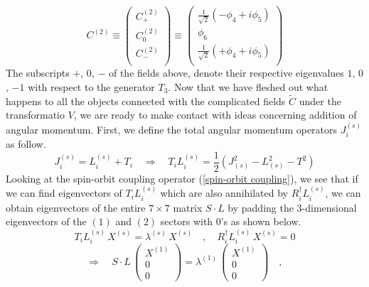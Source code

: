 %
%
\begin{equation}\label{T eiegen-fields 2}
C^{(2)}
\equiv
\left( \begin{array}{c}
C^{(2)}_{+} \\
C^{(2)}_{0} \\
C^{(2)}_{-} \\
\end{array} \right)
\equiv
\left( \begin{array}{c}
\frac{1}{\sqrt{2}} (-\phi_4 + i \phi_5) \\
\phi_6 \\
\frac{1}{\sqrt{2}} (+\phi_4 + i \phi_5) \\
\end{array} \right)
\end{equation}
%
%
The subscripts $+$, $0$, $-$ of the fields above, denote their respective eigenvalues $1$, $0$, $-1$ with respect to the generator $T_3$. Now that we have fleshed out what happens to all the objects connected with the complicated fields $\tilde{C}$ under the transformatio $V$, we are ready to make contact with ideas concerning addition of angular momentum. First, we define the total angular momentum operators $J_i^{(s)}$ as follow.
%
%
\begin{equation}\label{total angular momentum}
J_i^{(s)} = L_i^{(s)} + T_i
%
\quad \Rightarrow \quad
%
T_i L_i^{(s)} = \frac{1}{2} \left(
J^2_{(s)} - L^2_{(s)} - T^2
\right)
\end{equation}
%
%
Looking at the spin-orbit coupling operator (\ref{spin-orbit coupling}), we see that if we can find eigenvectors of $T_i L_i^{(s)}$ which are also annihilated by $R_i^\dagger L_i^{(s)}$, we can obtain eigenvectors of the entire $7 \times 7$ matrix $S \cdot L$ by padding the $3$-dimensional eigenvectors of the $(1)$ and $(2)$ sectors with $0$'s as shown below.
%
%
\begin{equation*}
T_i L_i^{(s)} \, X^{(s)} = \lambda^{(s)} \, X^{(s)}
%
\quad , \quad
%
R_i^\dagger L_i^{(s)} \, X^{(s)} = 0
\end{equation*}
%
%
\begin{equation*}
\Rightarrow \quad
%
S \cdot L \, \left( \begin{array}{c}
X^{(1)} \\
0 \\
0
\end{array} \right)
=
\lambda^{(1)} \, \left( \begin{array}{c}
X^{(1)} \\
0 \\
0
\end{array} \right)
%
\quad ,
\end{equation*}
